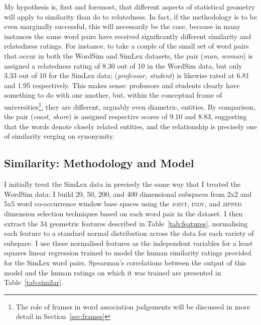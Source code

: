 My hypothesis is, first and foremost, that different aspects of statistical geometry will apply to similarity than do to relatedness.  In fact, if the methodology is to be even marginally successful, this will necessarily be the case, because in many instances the same word pairs have received significantly different similarity and relatedness ratings.  For instance, to take a couple of the small set of word pairs that occur in both the WordSim and SimLex datasets, the pair (\emph{man, woman}) is assigned a relatedness rating of 8.30 out of 10 in the WordSim data, but only 3.33 out of 10 for the SimLex data; (\emph{professor, student}) is likewise rated at 6.81 and 1.95 respectively.  This makes sense: professors and students clearly have something to do with one another, but, within the conceptual frame of universities\footnote{The role of frames in word association judgements will be discussed in more detail in Section~\ref{sec:frames}}, they are different, arguably even diametric, entities.  By comparison, the pair (\emph{coast, shore}) is assigned respective scores of 9.10 and 8.83, suggesting that the words denote closely related entities, and the relationship is precisely one of similarity verging on synonymity.

\subsection{Similarity: Methodology and Model}
I initially treat the SimLex data in precisely the same way that I treated the WordSim data: I build 20, 50, 200, and 400 dimensional subspaces from 2x2 and 5x5 word co-occurrence window base spaces using the \textsc{joint}, \textsc{indy}, and \textsc{zipped} dimension selection techniques based on each word pair in the dataset.  I then extract the 34 geometric features described in Table~\ref{tab:features}, normalising each feature to a standard normal distribution across the data for each variety of subspace.  I use these normalised features as the independent variables for a least squares linear regression trained to model the human similarity ratings provided for the SimLex word pairs.  Spearman's correlations between the output of this model and the human ratings on which it was trained are presented in Table~\ref{tab:similar}.

